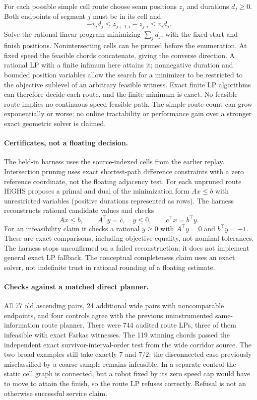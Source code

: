 \documentclass[11pt]{article}
\begin{document}
For each possible simple cell route choose seam positions \(z_j\)
and durations \(d_j\geq0\). Both endpoints of segment \(j\) must
be in its cell and
\[
  -v_i d_j\le z_{j+1,i}-z_{j,i}\le v_i d_j .
\]
Solve the rational linear program minimizing \(\sum_j d_j\),
with the fixed start and finish positions. Nonintersecting cells
can be pruned before the enumeration. At fixed speed the feasible
chords concatenate, giving the converse direction. A rational LP
with a finite infimum here attains it; nonnegative duration and
bounded position variables allow the search for a minimizer
to be restricted to the objective sublevel of an arbitrary
feasible witness. Exact finite LP algorithms can therefore decide
each route, and the finite minimum is exact. No feasible route
implies no continuous speed-feasible path. The simple route
count can grow exponentially or worse; no online tractability or
performance gain over a stronger exact geometric solver is claimed.

\paragraph{Certificates, not a floating decision.}
The held-in harness uses the source-indexed cells from the earlier
replay. Intersection pruning uses exact shortest-path difference
constraints with a zero reference coordinate, not the floating
adjacency test. For each unpruned route HiGHS proposes a primal
and dual of the minimization form \(A x\le b\) with unrestricted
variables (positive durations represented as rows). The harness
reconstructs rational candidate values and checks
\[
  A x\le b,\qquad A^\top y=c,\quad y\le0,\qquad c^\top x=b^\top y .
\]
For an infeasibility claim it checks a rational \(y\geq0\) with
\(A^\top y=0\) and \(b^\top y=-1\). These are exact comparisons,
including objective equality, not nominal tolerances. The
harness stops unconfirmed on a failed reconstruction; it does not
implement general exact LP fallback. The conceptual completeness
claim uses an exact solver, not indefinite trust in rational
rounding of a floating estimate.

\paragraph{Checks against a matched direct planner.}
All 77 old ascending pairs, 24 additional wide pairs with
noncomparable endpoints, and four controls agree with the
previous uninstrumented same-information route planner. There
were 744 audited route LPs, three of them infeasible with
exact Farkas witnesses. The 119 winning chords passed the
independent exact survivor-interval-order test from the wide
corridor source. The two broad examples still take exactly 7 and
\(7/2\); the disconnected case previously misclassified by a
coarse sample remains infeasible. In a separate control the static
cell graph is connected, but a robot fixed by its zero speed cap
would have to move to attain the finish, so the route LP refuses
correctly. Refusal is not an otherwise successful service claim.
\end{document}
